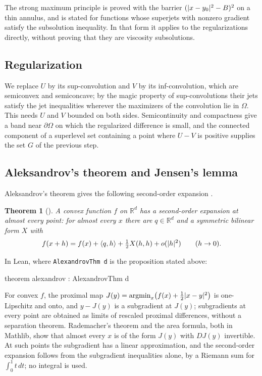 \documentclass[11pt,reqno]{amsart}
\newcommand{\R}{\mathbb{R}}
\DeclarePairedDelimiter{\abs}{\lvert}{\rvert}
\theoremstyle{plain}
\newtheorem{theorem}{Theorem}[section]
\theoremstyle{definition}
\theoremstyle{remark}
\begin{document}
The strong maximum principle is proved with the barrier
$(\abs{x - y_0}^2 - B)^2$ on a thin annulus, and is stated for functions whose
superjets with nonzero gradient satisfy the subsolution inequality. In that
form it applies to the regularizations directly, without proving that they
are viscosity subsolutions.

\subsection{Regularization}\label{ssec:reg}
We replace $U$ by its sup-convolution and $V$ by its inf-convolution, which
are semiconvex and semiconcave; by the magic property of sup-convolutions
\cite[Lemma~A.5]{CIL92} their jets satisfy the jet inequalities wherever the
maximizers of the convolution lie in $\Omega$. This needs $U$ and $V$ bounded
on both sides. Semicontinuity and compactness give a band near
$\partial\Omega$ on which the regularized difference is small, and the
connected component of a superlevel set containing a point where
$U - V$ is positive supplies the set $G$ of the previous step.

\subsection{Aleksandrov's theorem and Jensen's lemma}
Aleksandrov's theorem gives the following second-order expansion
\cite[Section~6.4]{EG15}.
\begin{theorem}[]\label{thm:alex}
A convex function $f$ on $\R^d$ has a second-order expansion at almost every
point: for almost every $x$ there are $q \in \R^d$ and a
symmetric bilinear form $X$ with
\[
  f(x + h) = f(x) + \langle q, h\rangle + \tfrac12 X(h,h) + o(\abs h^2)
  \qquad (h \to 0).
\]
\end{theorem}

\noindent In Lean, where \texttt{AlexandrovThm d} is the proposition stated
above:
\begin{lean}
theorem alexandrov : AlexandrovThm d
\end{lean}

For convex $f$, the proximal map $J(y) = \operatorname{argmin}_x\bigl(f(x) +
\frac12\abs{x - y}^2\bigr)$ is one-Lipschitz and onto, and $y - J(y)$ is a
subgradient at $J(y)$; subgradients at every point are obtained as limits of
rescaled proximal differences, without a separation theorem. Rademacher's
theorem and the area formula, both in Mathlib, show that almost every $x$ is
of the form $J(y)$ with $DJ(y)$ invertible. At such points the subgradient
has a linear approximation, and the second-order expansion follows from the
subgradient inequalities alone, by a Riemann sum for $\int_0^1 t\,dt$; no
integral is used.
\end{document}
